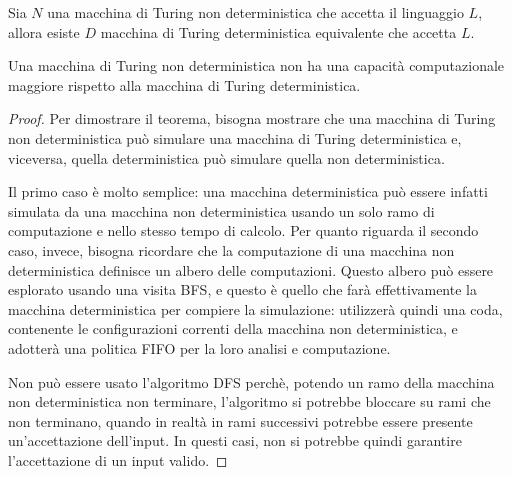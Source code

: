 \begin{thm}
    Sia $N$ una macchina di Turing non deterministica che accetta il
    linguaggio $L$, allora esiste $D$ macchina di Turing deterministica
    equivalente che accetta $L$.
\end{thm}
\begin{rem}
    Una macchina di Turing non deterministica non ha una capacità
    computazionale maggiore rispetto alla macchina di Turing deterministica.
\end{rem}
\begin{proof}
    Per dimostrare il teorema, bisogna mostrare che una macchina di Turing
    non deterministica può simulare una macchina di Turing deterministica e,
    viceversa, quella deterministica può simulare quella non deterministica.

    Il primo caso è molto semplice: una macchina deterministica può essere
    infatti simulata da una macchina non deterministica usando un solo ramo
    di computazione e nello stesso tempo di calcolo.
    Per quanto riguarda il secondo caso, invece, bisogna ricordare che la
    computazione di una macchina non deterministica definisce un albero delle
    computazioni. Questo albero può essere esplorato usando una visita BFS,
    e questo è quello che farà effettivamente la macchina deterministica per
    compiere la simulazione: utilizzerà quindi una coda, contenente le
    configurazioni correnti della macchina non deterministica, e adotterà
    una politica FIFO per la loro analisi e computazione.

    Non può essere usato l'algoritmo DFS perchè, potendo un ramo della
    macchina non deterministica non terminare, l'algoritmo si potrebbe
    bloccare su rami che non terminano, quando in realtà in rami
    successivi potrebbe essere presente un'accettazione dell'input.
    In questi casi, non si potrebbe quindi garantire l'accettazione di un
    input valido.
\end{proof}

